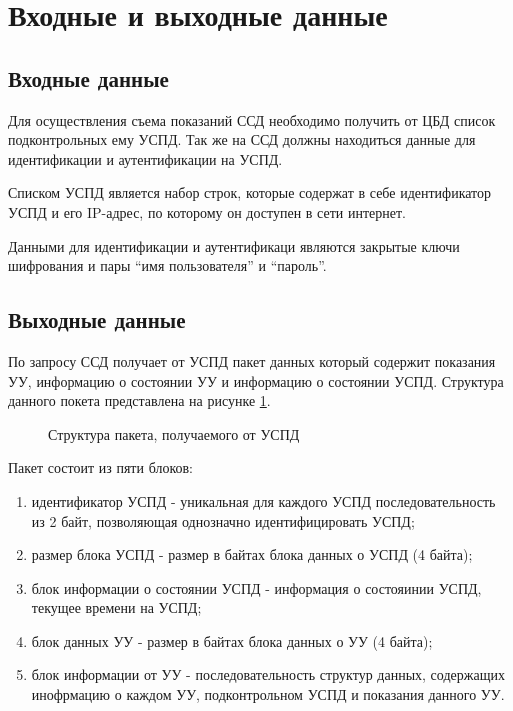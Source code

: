 \newpage
\section{Входные и выходные данные}
\setcounter{figure}{0}

\subsection{Входные данные}
Для осуществления съема показаний ССД необходимо получить от ЦБД список подконтрольных ему УСПД. Так же на ССД должны находиться данные для идентификации и аутентификации на УСПД. 

Списком УСПД является набор строк, которые содержат в себе идентификатор УСПД и его IP-адрес, по которому он доступен в сети интернет. 

Данными для идентификации и аутентификаци являются закрытые ключи шифрования и пары ``имя пользователя'' и ``пароль''.


\subsection{Выходные данные}

По запросу ССД получает от УСПД пакет данных который содержит показания УУ, информацию о состоянии УУ и информацию о состоянии УСПД. Структура данного покета представлена на рисунке \ref{img:answer_struct}.

\begin{figure}[!ht]
 \caption{Структура пакета, получаемого от УСПД}
 \label{img:answer_struct}
\end{figure}

Пакет состоит из пяти блоков:

\begin{enumerate}
 \item идентификатор УСПД - уникальная для каждого УСПД последовательность из 2 байт, позволяющая однозначно идентифицировать УСПД;
 \item размер блока УСПД - размер в байтах блока данных о УСПД (4 байта);
 \item блок информации о состоянии УСПД - информация о состояинии УСПД, текущее времени на УСПД;
 \item блок данных УУ - размер в байтах блока данных о УУ (4 байта);
 \item блок информации от УУ - последовательность структур данных, содержащих инофрмацию о каждом УУ, подконтрольном УСПД и показания данного УУ.
\end{enumerate}

